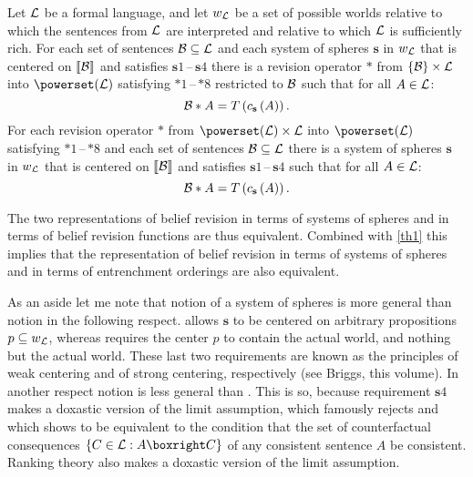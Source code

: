 \begin{theorem}\label{th2}
Let $\cal L$ be a formal language, and let $w_{\cal L}$ be a set of possible worlds relative to which the sentences from $\cal L$ are interpreted and relative to which $\cal L$ is sufficiently rich. For each set of sentences $\cal B\subseteq L$ and each system of spheres $\textbf{s}$ in $w_{\cal L}$ that is centered on $\llbracket\cal B\rrbracket$ and satisfies $\textbf{s}1$\,--\,$\textbf{s}4$ there is a revision operator $*$ from $\left\{\cal B\right\}\times\cal L$ into $\powerset\!\left(\cal L\right)$ satisfying $*1$\,--\,$*8$ restricted to $\cal B$ such that for all $A\in\cal L$:
$$\begin{cal}B\end{cal}*A=T\left(c_{\textbf{s}}\left(A\right)\right).$$
For each revision operator $*$ from $\powerset\!\left(\cal L\right)\times\cal L$ into $\powerset\!\left(\cal L\right)$ satisfying $*1$\,--\,$*8$ and each set of sentences $\cal B\subseteq L$ there is a system of spheres $\textbf{s}$ in $w_{\cal L}$ that is centered on $\llbracket\cal B\rrbracket$ and satisfies $\textbf{s}1$\,--\,$\textbf{s}4$ such that for all $A\in\cal L$:
$$\begin{cal}B\end{cal}*A=T\left(c_{\textbf{s}}\left(A\right)\right).$$
\end{theorem}
The two representations of belief revision in terms of systems of spheres and in terms of belief revision functions are thus equivalent. Combined with \autoref{th1} this implies that the representation of belief revision in terms of systems of spheres and in terms of entrenchment orderings are also equivalent.%

As an aside let me note that  notion of a system of spheres is more general than  notion in the following respect. \citet{g88} allows $\textbf{s}$ to be centered on arbitrary propositions $p\subseteq w_{\cal L}$, whereas \citet[14f]{l73} requires the center $p$ to contain the actual world, and nothing but the actual world. These last two requirements are known as the principles of weak centering and of strong centering, respectively (see Briggs, this volume). In another respect  notion is less general than . This is so, because requirement $\textbf{s}4$ makes a doxastic version of the limit assumption, which \citet[19f]{l73} famously rejects and which \citet{h79} shows to be equivalent to the condition that the set of counterfactual consequences $\{C\in\begin{cal}L\end{cal}:A\boxright C\}$ of any consistent sentence $A$ be consistent. Ranking theory also makes a doxastic version of the limit assumption.

